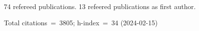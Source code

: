 74 refereed publications. 13 refeered publications as first author.

Total citations~=~3805; h-index~=~34 (2024-02-15)